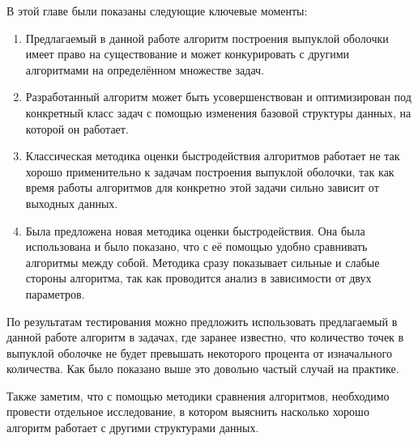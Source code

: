 В этой главе были показаны следующие ключевые моменты:
\begin{enumerate}
	\item Предлагаемый в данной работе алгоритм построения выпуклой оболочки имеет право на существование и может конкурировать с другими алгоритмами на определённом множестве задач.
	\item Разработанный алгоритм может быть усовершенствован и оптимизирован под конкретный класс задач с помощью изменения базовой структуры данных, на которой он работает.
	\item Классическая методика оценки быстродействия алгоритмов работает не так хорошо применительно к задачам построения выпуклой оболочки, так как время работы алгоритмов для конкретно этой задачи сильно зависит от выходных данных.
	\item Была предложена новая методика оценки быстродействия. Она была использована и было показано, что с её помощью удобно сравнивать алгоритмы между собой. Методика сразу показывает сильные и слабые стороны алгоритма, так как проводится анализ в зависимости от двух параметров.
\end{enumerate}

По результатам тестирования можно предложить использовать предлагаемый в данной работе алгоритм в задачах, где заранее известно, что количество точек в выпуклой оболочке не будет превышать некоторого процента от изначального количества. Как было показано выше это довольно частый случай на практике.

Также заметим, что с помощью методики сравнения алгоритмов, необходимо провести отдельное исследование, в котором выяснить насколько хорошо алгоритм работает с другими структурами данных.
